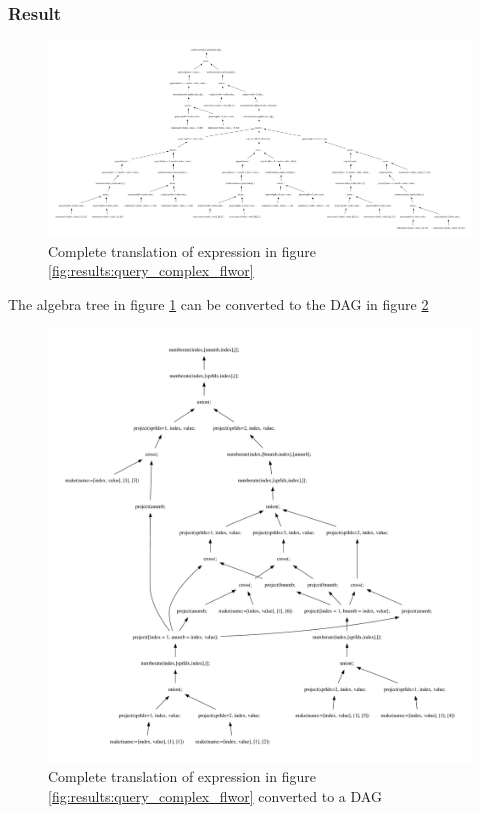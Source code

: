 \subsubsection{Result}

\begin{figure}[!htp]
\begin{center}
  \includegraphics[width=1.0\textwidth]{img/graphs/td_impl_flwor_complex_xq_relalg} \caption{Complete translation of expression in figure
  \ref{fig:results:query_complex_flwor}}
  \label{fig:results:query_complex_flwor_result}
\end{center}
\end{figure}


The algebra tree in figure \ref{fig:results:query_complex_flwor_result} can
be converted to the DAG in figure
\ref{fig:results:query_complex_flwor_result_dag}

\begin{figure}[!htp]
\begin{center}
  \includegraphics[width=1.0\textwidth]{img/graphs/td_impl_flwor_complex_xq_relalg_dag} 
  \caption{Complete translation of expression in figure
  \ref{fig:results:query_complex_flwor} converted to a DAG}
  \label{fig:results:query_complex_flwor_result_dag}
\end{center}
\end{figure}
\newpage

